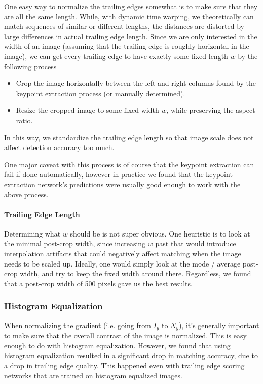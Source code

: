 One easy way to normalize the trailing edges somewhat is to make sure that they are all the same length.
While, with dynamic time warping, we theoretically can match sequences of similar or different lengths, the distances are distorted by large differences in actual trailing edge length.
Since we are only interested in the width of an image (assuming that the trailing edge is roughly horizontal in the image), we can get every trailing edge to have exactly some fixed length $w$ by the following process

\begin{itemize}
    \item Crop the image horizontally between the left and right columns found by the keypoint extraction process (or manually determined).
    \item Resize the cropped image to some fixed width $w$, while preserving the aspect ratio.
\end{itemize}

In this way, we standardize the trailing edge length so that image scale does not affect detection accuracy too much.

One major caveat with this process is of course that the keypoint extraction can fail if done automatically, however in practice we found that the keypoint extraction network's predictions were usually good enough to work with the above process.


\paragraph{Trailing Edge Length}

Determining what $w$ should be is not super obvious.
One heuristic is to look at the minimal post-crop width, since increasing $w$ past that would introduce interpolation artifacts that could negatively affect matching when the image needs to be scaled up.
Ideally, one would simply look at the mode / average post-crop width, and try to keep the fixed width around there.
Regardless, we found that a post-crop width of 500 pixels gave us the best results. %

\subsubsection{Histogram Equalization}

When normalizing the gradient (i.e. going from $I_y$ to $N_y$), it's generally important to make sure that the overall contrast of the image is normalized.
This is easy enough to do with histogram equalization.
However, we found that using histogram equalization resulted in a significant drop in matching accuracy, due to a drop in trailing edge quality.
This happened even with trailing edge scoring networks that are trained on histogram equalized images.

